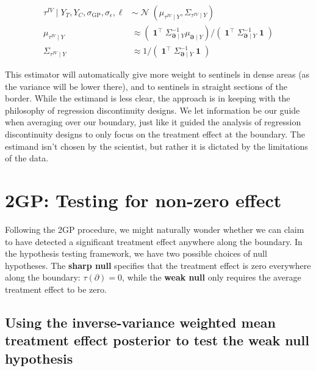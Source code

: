 \documentclass[letter]{article}
\newcommand{\genericdel}[3]{%
      \left#1#3\right#2
    }
\newcommand{\del}[1]{\genericdel(){#1}}
\DeclareMathOperator{\normal}{\mathcal{N}}
\DeclareMathOperator{\ones}{\mathbf{1}}
\newcommand{\trans}{^{\intercal}}
\newcommand{\sigmaf}{\sigma_{\mathrm{GP}}}
\newcommand{\sigman}{\sigma_{\epsilon}}
\newcommand{\boundary}{\partial}
\newcommand{\sentinels}{\bm{\boundary}}
\newcommand{\invvar}{\tau^{IV}}
\begin{document}
\begin{equation}
\label{eq:invvar}
\begin{split}
    \invvar \mid Y_T, Y_C, \sigmaf, \sigman, \ell &\sim \normal\del{\mu_{\invvar \mid Y}, \Sigma_{\invvar \mid Y}} \\
    \mu_{\invvar \mid Y} &\approx \del{\ones\trans \Sigma_{\sentinels \mid Y}^{-1} \mu_{\sentinels \mid Y}} \big/ \del{\ones\trans \Sigma_{\sentinels \mid Y}^{-1} \ones}  \\
    \Sigma_{\invvar \mid Y} &\approx 1 \big/ \del{\ones\trans \Sigma_{\sentinels \mid Y}^{-1} \ones}
\end{split}\end{equation}

This estimator will automatically give more weight to sentinels in dense
areas (as the variance will be lower there), and to sentinels in
straight sections of the border. While the estimand is less clear, the
approach is in keeping with the philosophy of regression discontinuity
designs. We let information be our guide when averaging over our
boundary, just like it guided the analysis of regression discontinuity
designs to only focus on the treatment effect at the boundary. The
estimand isn't chosen by the scientist, but rather it is dictated by the
limitations of the data.
    


    	\section{2GP: Testing for non-zero
effect}\label{gp-testing-for-non-zero-effect}

Following the 2GP procedure, we might naturally wonder whether we can
claim to have detected a significant treatment effect anywhere along the
boundary. In the hypothesis testing framework, we have two possible
choices of null hypotheses. The \textbf{sharp null} specifies that the
treatment effect is zero everywhere along the boundary:
\(\tau(\boundary)=0\), while the \textbf{weak null} only requires the
average treatment effect to be zero.

\subsection{Using the inverse-variance weighted mean treatment effect
posterior to test the weak null
hypothesis}\label{using-the-inverse-variance-weighted-mean-treatment-effect-posterior-to-test-the-weak-null-hypothesis}
\end{document}
